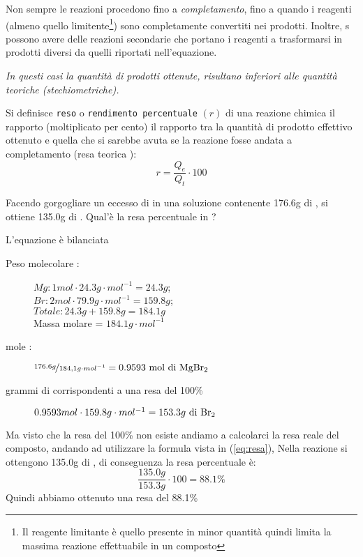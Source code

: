 Non sempre le reazioni procedono fino a \textit{completamento}, fino a quando i reagenti (almeno quello
limitente\footnote{Il reagente limitante è quello presente in minor quantità quindi limita la massima
  reazione effettuabile in un composto}) sono completamente convertiti nei prodotti. Inoltre, s possono
avere delle reazioni secondarie che portano i reagenti a trasformarsi in prodotti diversi da quelli
riportati nell'equazione.
\begin{center}
  \it In questi casi la quantità di prodotti ottenute, risultano inferiori alle quantità teoriche (stechiometriche).
\end{center}
\begin{defi}
  \label{defi:resarendimento}
  Si definisce \texttt{reso} o \texttt{rendimento percentuale} $(r)$ di una reazione chimica il rapporto
  (moltiplicato per cento) il rapporto tra la quantità di prodotto effettivo ottenuto  e quella
  che si sarebbe avuta se la reazione fosse andata a completamento (resa teorica ):
  \begin{equation}
    \label{eq:resa}
    r=\frac{Q_e}{Q_t}\cdot 100
  \end{equation}
\end{defi}
\begin{ess}
  Facendo gorgogliare un eccesso di  in una soluzione contenente 176.6g di , si
  ottiene 135.0g di . Qual'è la resa percentuale in ?
  \begin{center}
     L'equazione è bilanciata
  \end{center}
  \begin{description}
  \item[Peso molecolare :] $Mg: 1mol\cdot 24.3g\cdot mol^{-1}=24.3g$;\\
    $Br:2mol\cdot 79.9g\cdot mol^{-1}=159.8g$;\\
    $Totale: 24.3g+159.8g=184.1g$\\
    Massa molare = $184.1g\cdot mol^{-1}$
  \item[mole :] $\nicefrac{176.6g}{184,1g\cdot mol^{-1}}=0.9593\text{ mol di \ce{MgBr2}}$
  \item[grammi di  corrispondenti a una resa del 100\%] $0.9593 mol \cdot 159.8g\cdot mol^{-1}=153.3g\text{ di \ce{Br2}}$ 
  \end{description}
  Ma visto che la resa del 100\% non esiste andiamo a calcolarci la resa reale del composto, andando ad
  utilizzare la formula vista in (\ref{eq:resa}), Nella reazione si ottengono 135.0g di , di
  conseguenza la resa percentuale è:
  \begin{equation*}
    \frac{135.0g}{153.3g}\cdot 100=88.1\%
  \end{equation*}
  Quindi abbiamo ottenuto una resa del 88.1\%
\end{ess}

